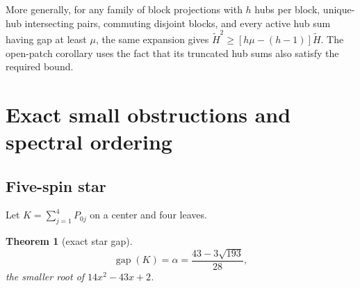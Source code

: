\documentclass[11pt,a4paper]{article}
\newtheorem{theorem}{Theorem}[section]
\theoremstyle{remark}\newtheorem{remark}[theorem]{Remark}
\newcommand{\gap}{\operatorname{gap}}\newcommand{\ran}{\operatorname{ran}}
\newcommand{\Hb}{\widetilde H}\newcommand{\Dstar}{\Delta_*}
\begin{document}
More generally, for any family of block projections with $h$ hubs per block, unique-hub intersecting pairs, commuting disjoint blocks, and every active hub sum having gap at least $\mu$, the same expansion gives $\Hb^2\ge[h\mu-(h-1)]\Hb$. The open-patch corollary uses the fact that its truncated hub sums also satisfy the required bound.

\section{Exact small obstructions and spectral ordering}\label{sec:square}
\subsection{Five-spin star}
Let $K=\sum_{j=1}^4P_{0j}$ on a center and four leaves.
\begin{theorem}[exact star gap]\label{thm:star}
\[
 \gap(K)=\alpha=\frac{43-3\sqrt{193}}{28},
\]
the smaller root of $14x^2-43x+2$.
\end{theorem}
\end{document}
